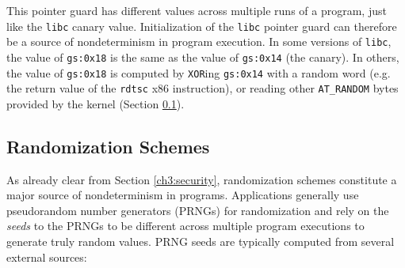 This pointer guard has different values
across multiple runs of a program, just like the \texttt{libc} canary
value. Initialization of the \texttt{libc} pointer guard can 
therefore be a source of nondeterminism in program execution. 
In some versions of \texttt{libc}, the value of \texttt{gs:0x18} is the same
as the value of \texttt{gs:0x14} (the canary). In others,
the value of \texttt{gs:0x18} is computed by \texttt{XOR}ing \texttt{gs:0x14} with 
a random word (e.g. the return value of the \texttt{rdtsc} x86 instruction),
or reading other \texttt{AT\_RANDOM} bytes provided by the kernel
 (Section \ref{ch3:rand}).

\subsection{Randomization Schemes} \label{ch3:rand}
As already clear from Section \ref{ch3:security}, 
randomization schemes constitute a major source of nondeterminism 
in programs. Applications generally use pseudorandom number generators (PRNGs)
for randomization and rely on the {\em seeds} to the PRNGs
to be different across multiple program executions 
to generate truly random values. PRNG seeds are typically 
computed from several external sources:

